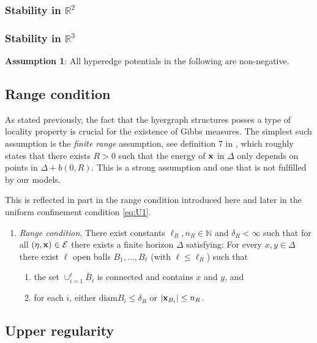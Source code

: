 \subsubsection{Stability in $\mathbb R^2$}
\tbd
\subsubsection{Stability in $\mathbb R^3$}
\tbd
{}


\textbf{Assumption 1}: All hyperedge potentials in the following are non-negative.

\subsection{Range condition} \label{sec:range}
As stated previously, the fact that the hyergraph structures posses a type of locality property is crucial for the existence of Gibbs measures. The simplest such assumption is the \textit{finite range} assumption, see definition 7 in \cite{Dereudre2017}, which roughly states that there exists $R>0$ such that the energy of ${\mathbf{x}}$ in $\Delta$ only depends on points in $\Delta + b(0,R)$. This is a strong assumption and one that is not fulfilled by our models. 

This is reflected in part in the range condition introduced here and later in the uniform confinement condition \ref{eq:U1}.

\begin{enumerate}[\textbf{(R)}]\label{(R)}
	\item \textit{Range condition}. There exist constants $\ell_R,n_R \in \mathbb N$ and $\delta_R < \infty$ such that for all $(\eta,{\mathbf{x}}) \in \mathcal E$ there exists a finite horizon $\Delta$ satisfying: For every $x,y \in \Delta$ there exist $\ell$ open balls $B_1, \dots, B_\ell$ (with $\ell \leq \ell_R$) such that
	\begin{enumerate}[-]
		\item the set $\cup^\ell_{i=1} \bar B_i$ is connected and contains $x$ and $y$, and 
		\item for each $i$, either $\text{diam} B_i \leq \delta_R$ or $|{\mathbf{x}}_{B_i}| \leq n_R$.
	\end{enumerate}
\end{enumerate}

\subsection{Upper regularity}


